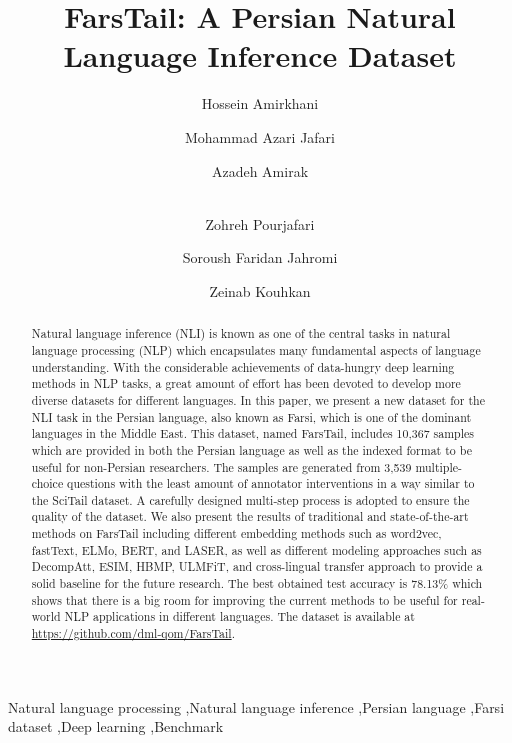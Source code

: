 \documentclass[preprint,12pt]{elsarticle}
\begin{document}
\begin{frontmatter}





\title{FarsTail: A Persian Natural Language Inference Dataset}



\author{Hossein Amirkhani} 
\author{Mohammad Azari Jafari}
\author{Azadeh Amirak}
\author{\\Zohreh Pourjafari} 
\author{Soroush Faridan Jahromi}
\author{Zeinab Kouhkan}
\address{Computer Engineering and IT Department, University of Qom, Iran}


\begin{abstract}
Natural language inference (NLI) is known as one of the central tasks in natural language processing (NLP) which encapsulates many fundamental aspects of language understanding. With the considerable achievements of data-hungry deep learning methods in NLP tasks, a great amount of effort has been devoted to develop more diverse datasets for different languages. In this paper, we present a new dataset for the NLI task in the Persian language, also known as Farsi, which is one of the dominant languages in the Middle East. This dataset, named FarsTail, includes 10,367 samples which are provided in both the Persian language as well as the indexed format to be useful for non-Persian researchers. The samples are generated from 3,539 multiple-choice questions with the least amount of annotator interventions in a way similar to the SciTail dataset. A carefully designed multi-step process is adopted to ensure the quality of the dataset. We also present the results of traditional and state-of-the-art methods on FarsTail including different embedding methods such as word2vec, fastText, ELMo, BERT, and LASER, as well as different modeling approaches such as DecompAtt, ESIM, HBMP, ULMFiT, and cross-lingual transfer approach to provide a solid baseline for the future research. The best obtained test accuracy is 78.13\% which shows that there is a big room for improving the current methods to be useful for real-world NLP applications in different languages. The dataset is available at \url{https://github.com/dml-qom/FarsTail}. 
\end{abstract}





\begin{keyword}
Natural language processing \sep Natural language inference \sep Persian language \sep Farsi dataset \sep Deep learning \sep Benchmark




\end{keyword}


\end{frontmatter}
\end{document}
